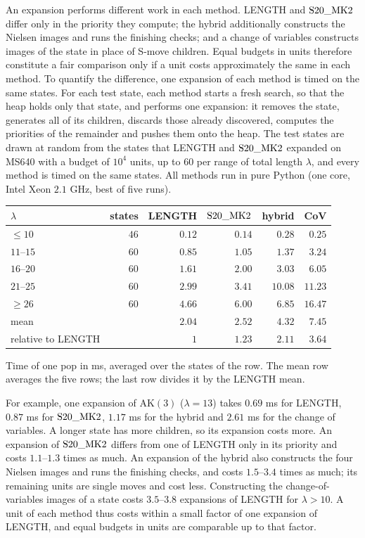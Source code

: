 An expansion performs different work in each method. LENGTH and $\mathrm{S20\_MK2}$ differ only in the priority they compute; the
hybrid additionally constructs the Nielsen images and runs the finishing checks; and a change of variables constructs
images of the state in place of S-move children. Equal budgets in units therefore constitute a fair comparison only
if a unit costs approximately the same in each method. To quantify the difference, one expansion of each method is
timed on the same states. For each test state, each method starts a fresh search, so that the heap holds only that
state, and performs one expansion: it removes the state, generates all of its children, discards those already
discovered, computes the priorities of the remainder and pushes them onto the heap. The test states are drawn at random
from the states that LENGTH and $\mathrm{S20\_MK2}$ expanded on MS640 with a budget of $10^4$ units, up to $60$ per range of total
length $\lambda$, and every method is timed on the same states. All methods run in pure Python (one core, Intel Xeon
$2.1$ GHz, best of five runs).
\begin{center}
\small
\begin{tabular}{lrrrrr}
\toprule
$\lambda$ & states & LENGTH & $\mathrm{S20\_MK2}$ & hybrid & CoV\\
\midrule
$\le10$ & $46$ & $0.12$ & $0.14$ & $0.28$ & $0.25$\\
$11$--$15$ & $60$ & $0.85$ & $1.05$ & $1.37$ & $3.24$\\
$16$--$20$ & $60$ & $1.61$ & $2.00$ & $3.03$ & $6.05$\\
$21$--$25$ & $60$ & $2.99$ & $3.41$ & $10.08$ & $11.23$\\
$\ge26$ & $60$ & $4.66$ & $6.00$ & $6.85$ & $16.47$\\
\midrule
mean & & $2.04$ & $2.52$ & $4.32$ & $7.45$\\
relative to LENGTH & & $1$ & $1.23$ & $2.11$ & $3.64$\\
\bottomrule
\end{tabular}

\smallskip
\footnotesize Time of one pop in ms, averaged over the states of the row. The mean row averages the five rows; the last row divides it by the LENGTH mean.
\end{center}
For example, one expansion of $\mathrm{AK}(3)$ ($\lambda=13$) takes $0.69$ ms for LENGTH, $0.87$ ms for $\mathrm{S20\_MK2}$,
$1.17$ ms for the hybrid and $2.61$ ms for the change of variables. A longer state has more children, so its expansion
costs more. An expansion of $\mathrm{S20\_MK2}$ differs from one of LENGTH only in its priority and costs $1.1$--$1.3$ times as much.
An expansion of the hybrid also constructs the four Nielsen images and runs the finishing checks, and costs $1.5$--$3.4$
times as much; its remaining units are single moves and cost less. Constructing the change-of-variables images of a
state costs $3.5$--$3.8$ expansions of LENGTH for $\lambda>10$. A unit of each method thus costs within a small factor
of one expansion of LENGTH, and equal budgets in units are comparable up to that factor.

